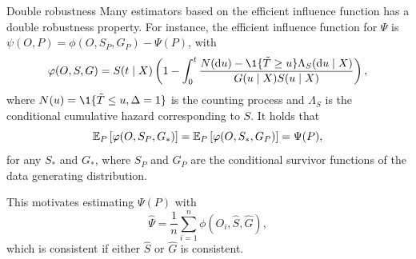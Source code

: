 \documentclass[smaller]{beamer}\usepackage{listings}
\begin{document}
\begin{frame}[label={sec:orga16fffb}]{Double robustness}
\small Many estimators based on the efficient influence function has a double robustness property.
For instance, the efficient influence function for \(\Psi\) is \(\psi(O, P) = \phi(O, S_P, G_P) -
\Psi(P)\), with
\begin{equation*}
  \phi(O, S, G) = S(t \mid X)
  \left(
    1- \int_0^t \frac{N(\diff u) - \1{\{\tilde T \geq u\}} \Lambda_S(\diff u \mid X)}{G(u \mid X) S(u \mid X)}   
  \right),
\end{equation*}
where \(N(u) = \1{\{\tilde T \leq u, \Delta=1\}}\) is the counting process and $\Lambda_S$ is the
conditional cumulative hazard corresponding to \(S\). It holds that
\begin{equation*}
  \operatorname{\mathbb{E}}_P{\left[ \varphi(O, S_P, G_*) \right]}
  = \operatorname{\mathbb{E}}_P{\left[ \varphi(O, S_*, G_P) \right]}
  = \Psi(P),
\end{equation*}
for any \(S_*\) and \(G_*\), where \(S_P\) and \(G_P\) are the conditional survivor functions of the
data generating distribution.

\vfill

This motivates estimating $\Psi(P)$ with
\begin{equation*}
  \hat \Psi = \frac{1}{n}\sum_{i=1}^{n}\phi(O_i, \hat S, \hat G),
\end{equation*}
which is consistent if either \(\hat S\) or \(\hat G\) is consistent.
\end{frame}
\end{document}
